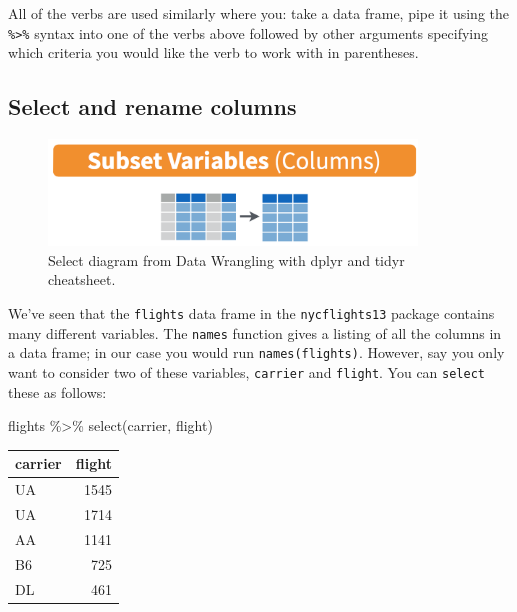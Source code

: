 \documentclass[
  letterpaper,
  DIV=11,
  numbers=noendperiod]{scrartcl}
\newenvironment{Shaded}{\begin{snugshade}}{\end{snugshade}}
\newcommand{\FunctionTok}[1]{\textcolor[rgb]{0.28,0.35,0.67}{#1}}
\newcommand{\NormalTok}[1]{\textcolor[rgb]{0.00,0.23,0.31}{#1}}
\newcommand{\SpecialCharTok}[1]{\textcolor[rgb]{0.37,0.37,0.37}{#1}}
\begin{document}
All of the verbs are used similarly where you: take a data frame, pipe
it using the \texttt{\%\textgreater{}\%} syntax into one of the verbs
above followed by other arguments specifying which criteria you would
like the verb to work with in parentheses.

\subsection{Select and rename columns}\label{select-and-rename-columns}

\begin{figure}[H]

{\centering \includegraphics[width=3.85in,height=\textheight]{select.png}

}

\caption{Select diagram from Data Wrangling with dplyr and tidyr
cheatsheet.}

\end{figure}%

We've seen that the \texttt{flights} data frame in the
\texttt{nycflights13} package contains many different variables. The
\texttt{names} function gives a listing of all the columns in a data
frame; in our case you would run \texttt{names(flights)}. However, say
you only want to consider two of these variables, \texttt{carrier} and
\texttt{flight}. You can \texttt{select} these as follows:

\begin{Shaded}
\begin{Highlighting}[]
\NormalTok{flights }\SpecialCharTok{\%\textgreater{}\%}
  \FunctionTok{select}\NormalTok{(carrier, flight)}
\end{Highlighting}
\end{Shaded}

\begin{longtable}[]{@{}lr@{}}
\toprule\noalign{}
carrier & flight \\
\midrule\noalign{}
\endhead
\bottomrule\noalign{}
\endlastfoot
UA & 1545 \\
UA & 1714 \\
AA & 1141 \\
B6 & 725 \\
DL & 461 \\
\end{longtable}
\end{document}
